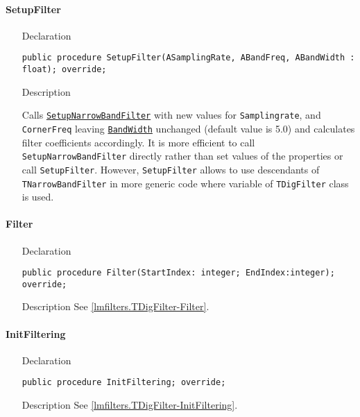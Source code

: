 \documentclass[12pt,a4paper,oneside]{report}
\newcommand{\declarationitem}[1]{{\addfontfeatures{FakeSlant} #1}}
\newcommand{\descriptiontitle}[1]{{\addfontfeatures{FakeSlant}#1}}
\newcommand{\code}[1]{\texttt{#1}}
\begin{document}
\paragraph{SetupFilter}
\label{lmRecursFilters.TNarrowBandFilter-SetupFilter}
\begin{itemize}\item[\declarationitem{Declaration}\hfill]
	\begin{flushleft}
		\code{public procedure SetupFilter(ASamplingRate, ABandFreq, ABandWidth : float); override;}
	\end{flushleft}
	\item[\descriptiontitle{Description}\hfill] 
	\begin{flushleft}
		Calls \hyperref[lmRecursFilters.TNarrowBandFilter-SetupNarrowBandFilter]{\code{SetupNarrowBandFilter}} with new values for \code{Samplingrate}, and \code{CornerFreq} leaving \hyperref[lmRecursFilters.TNarrowBandFilter-BandWidth]{\code{BandWidth}} unchanged (default value is 5.0) and calculates filter coefficients accordingly. It is more efficient to call \code{SetupNarrowBandFilter} directly rather than set values of the properties or call \code{SetupFilter}. However, \code{SetupFilter} allows to use descendants of \code{TNarrowBandFilter} in more generic code where variable of \code{TDigFilter} class is used.
	\end{flushleft}
\end{itemize}
\paragraph{Filter}
\label{lmRecursFilters.TNarrowBandFilter-Filter}
\begin{itemize}\item[\declarationitem{Declaration}\hfill]
	\begin{flushleft}
		\code{public procedure Filter(StartIndex: integer; EndIndex:integer); override;}
	\end{flushleft}
	\item[\descriptiontitle{Description}\hfill] See \ref{lmfilters.TDigFilter-Filter}.
\end{itemize}
\paragraph{InitFiltering}
\label{lmRecursFilters.TNarrowBandFilter-InitFiltering}
\begin{itemize}\item[\declarationitem{Declaration}\hfill]
	\begin{flushleft}
	\code{public procedure InitFiltering; override;}
	\end{flushleft}
	\item[\descriptiontitle{Description}\hfill] See \ref{lmfilters.TDigFilter-InitFiltering}.
\end{itemize}
\end{document}
